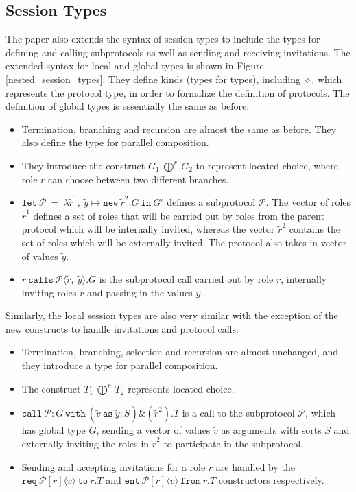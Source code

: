\documentclass[12pt,twoside]{report}
\begin{document}
\subsection{Session Types}\label{nested-session-types}
The paper also extends the syntax of session types to include the types for defining and calling subprotocols as well as sending and receiving invitations. The extended syntax for local and global types is shown in Figure \ref{nested_session_types}. They define kinds (types for types), including $\diamond$, which represents the protocol type, in order to formalize the definition of protocols. The definition of global types is essentially the same as before:
\begin{itemize}
    \item Termination, branching and recursion are almost the same as before. They also define the type for parallel composition.
    \item They introduce the construct $G_1\ \bigoplus^r\ G_2$ to represent located choice, where role $r$ can choose between two different branches. 
    \item $\texttt{let}\ \mathcal{P}\ =\ \lambda\widetilde{r}^1,\ \widetilde{y} \mapsto \texttt{new}\ \widetilde{r}^2.G\ \texttt{in}\ G'$ defines a subprotocol $\mathcal{P}$. The vector of roles $\widetilde{r}^1$ defines a set of roles that will be carried out by roles from the parent protocol which will be internally invited, whereas the vector $\widetilde{r}^2$ contains the set of roles which will be externally invited. The protocol also takes in vector of values $\widetilde{y}$.
    \item $r\ \texttt{calls}\ \mathcal{P}\langle \widetilde{r},\ \widetilde{y}\rangle.G$ is the subprotocol call carried out by role $r$, internally inviting roles $\widetilde{r}$ and passing in the values $\widetilde{y}$.
\end{itemize}{}

Similarly, the local session types are also very similar with the exception of the new constructs to handle invitations and protocol calls:
\begin{itemize}
    \item Termination, branching, selection and recursion are almost unchanged, and they introduce a type for parallel composition. 
    \item The construct $T_1\ \bigoplus^r\ T_2$ represents located choice.
    \item $\texttt{call}\ \mathcal{P}:G\ \texttt{with}\ (\widetilde{v}\ \texttt{as}\ \widetilde{y}:\widetilde{S})\&(\widetilde{r}^2).T$ is a call to the subprotocol $\mathcal{P}$, which has global type $G$, sending a vector of values $\widetilde{v}$ as arguments with sorts $\widetilde{S}$ and externally inviting the roles in $\widetilde{r}^2$ to participate in the subprotocol.
    \item Sending and accepting invitations for a role $r$ are handled by the $\texttt{req}\ \mathcal{P}[r]\langle \widetilde{v} \rangle\ \texttt{to}\ r.T$ and $\texttt{ent}\ \mathcal{P}[r]\langle \widetilde{v} \rangle\ \texttt{from}\ r.T$ constructors respectively.
\end{itemize}{}
\end{document}

